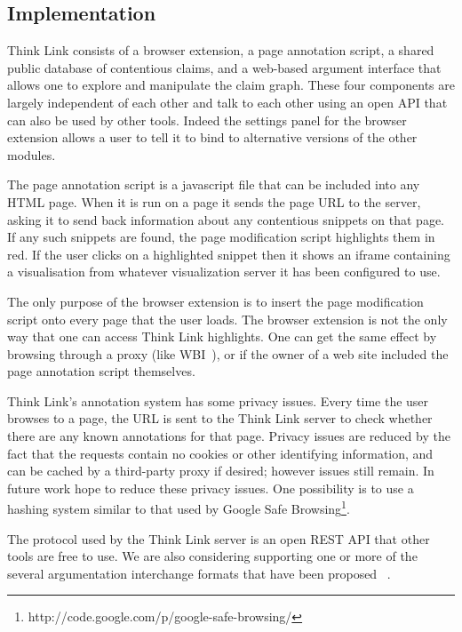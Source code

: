 \documentclass{chi2009}
\newcommand{\todo}[1]{}
\begin{document}
\todo{BUG: don't have 'add' button for snippets}


\subsection{Implementation}

Think Link consists of a browser extension, a page annotation script, a shared public database of contentious claims, and a web-based argument interface that allows one to explore and manipulate the claim graph. These four components are largely independent of each other and talk to each other using an open API that can also be used by other tools. Indeed the settings panel for the browser extension allows a user to tell it to bind to alternative versions of the other modules.

The page annotation script is a javascript file that can be included into any HTML page. When it is run on a page it sends the page URL to the server, asking it to send back information about any contentious snippets on that page. If any such snippets are found, the page modification script highlights them in red. If the user clicks on a highlighted snippet then it shows an iframe containing a visualisation from whatever visualization server it has been configured to use.

The only purpose of the browser extension is to insert the page modification script onto every page that the user loads. The browser extension is not the only way that one can access Think Link highlights. One can get the same effect by browsing through a proxy (like WBI~\cite{Barrett1997}), or if the owner of a web site included the page annotation script themselves.

Think Link's annotation system has some privacy issues. Every time the user browses to a page, the URL is sent to the Think Link server to check whether there are any known annotations for that page. Privacy issues are reduced by the fact that the requests contain no cookies or other identifying information, and can be cached by a third-party proxy if desired; however issues still remain. In future work hope to reduce these privacy issues. One possibility is to use a hashing system similar to that used by Google Safe Browsing\footnote{http://code.google.com/p/google-safe-browsing/}.

The protocol used by the Think Link server is an open REST API that other tools are free to use. We are also considering supporting one or more of the several argumentation interchange formats that have been proposed ~\cite{Rahwan2007a,McGinnis2007}.
\end{document}
